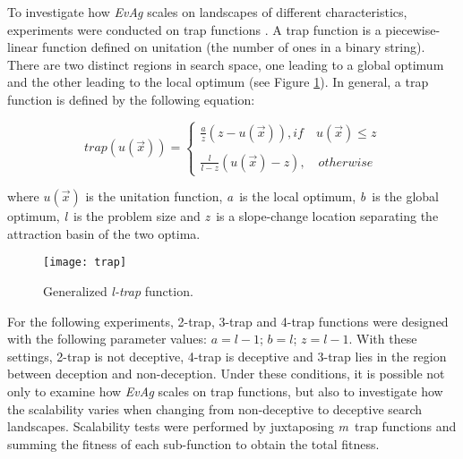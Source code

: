 

To investigate how \emph{EvAg} scales on landscapes of different characteristics, experiments were conducted on trap functions \cite{ackley:trap}. A trap function is a piecewise-linear function defined on unitation (the number of ones in a binary string). There are two distinct regions in search space, one leading to a global optimum and the other leading to the local optimum (see Figure \ref{fig:trap}).  In general, a trap function is defined by the following equation:


\begin{equation} \label{eq:trap}
trap(u(\overrightarrow{x}))=\left\{ \begin{array}{ll}
\frac{a}{z}(z-u(\overrightarrow{x})),if \quad u(\overrightarrow{x}) \leq z \\
\\
\frac{l}{l-z}(u(\overrightarrow{x})-z),\quad otherwise
\end{array} \right.
\end{equation}

\noindent
where $u(\overrightarrow{x})$ is the unitation function, \textit{a}\ is the local optimum, \textit{b}\ is the global optimum, \textit{l}\ is the problem size and \textit{z}\ is a slope-change location separating the attraction basin of the two optima. 

\begin{figure}[!htpb]
\centerline{\texttt{[image: trap]}}

\caption{Generalized \emph{l-trap} function. }
\label{fig:trap}
\end{figure}


For the following experiments, 2-trap, 3-trap and 4-trap functions were designed with the following parameter values: $a = l-1$; $b = l$; $z = l-1$. With these settings, 2-trap  is not deceptive, 4-trap is deceptive and 3-trap lies in the region between deception and non-deception. Under these conditions, it is possible not only to examine how \emph{EvAg} scales on trap functions, but also to investigate how the scalability varies when changing from non-deceptive to deceptive search landscapes.
Scalability tests were performed by juxtaposing \textit{m}\ trap functions and summing the fitness of each sub-function to obtain the total fitness. 




